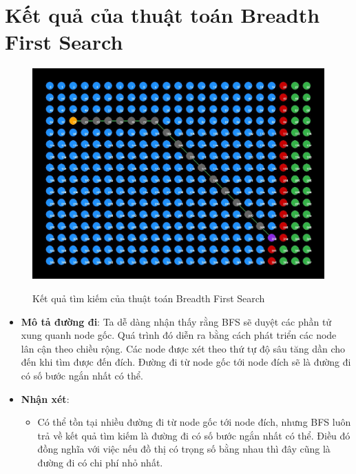\section{Kết quả của thuật toán Breadth First Search}
\begin{figure}[H]
    \centering
    \includegraphics[scale=0.4]{pic/BFS.jpg}
    \label{fig:my_label}
    \caption{Kết quả tìm kiếm của thuật toán Breadth First Search}
\end{figure}
\begin{itemize}
    \item \textbf{Mô tả đường đi}: Ta dễ dàng nhận thấy rằng BFS sẽ duyệt các phần tử xung quanh node gốc. Quá trình đó diễn ra bằng cách phát triển các node lân cận theo chiều rộng. Các node được xét theo thứ tự độ sâu tăng dần cho đến khi tìm được đến đích. Đường đi từ node gốc tới node đích sẽ là đường đi có số bước ngắn nhất có thể.
    \item \textbf{Nhận xét}: 
    \begin{itemize}
        \item Có thể tồn tại nhiều đường đi từ node gốc tới node đích, nhưng BFS luôn trả về kết quả tìm kiếm là đường đi có số bước ngắn nhất có thể. Điều đó đồng nghĩa với việc nếu đồ thị có trọng số bằng nhau thì đây cũng là đường đi có chi phí nhỏ nhất.
    \end{itemize}
\end{itemize}
